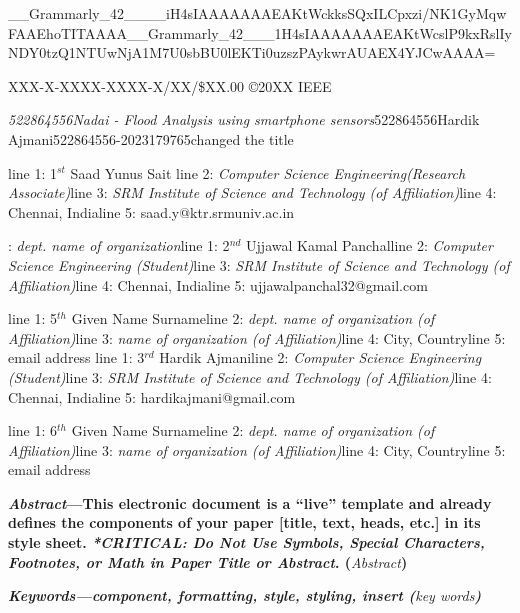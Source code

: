 \documentclass{article} %
\begin{document}


\noindent \_\_Grammarly\_42\_\_\_\_iH4sIAAAAAAAEAKtWckksSQxILCpxzi/NK1GyMqwFAAEhoTITAAAA\_\_Grammarly\_42\_\_\_1H4sIAAAAAAAEAKtWcslP9kxRslIyNDY0tzQ1NTUwNjA1M7U0sbBU0lEKTi0uzszPAykwrAUAEX4YJCwAAAA=

\noindent 

\noindent 

\noindent 

\noindent XXX-X-XXXX-XXXX-X/XX/\$XX.00 {\copyright}20XX IEEE

\noindent \textit{522864556Nadai - Flood Analysis using smartphone sensors}522864556Hardik Ajmani522864556-2023179765changed the title\textit{}

\noindent 

\noindent line 1: 1${}^{st}$ Saad Yunus Sait line 2: \textit{Computer Science Engineering(Research Associate)}line 3: \textit{SRM Institute of Science and Technology (of Affiliation)}line 4: Chennai, Indialine 5: saad.y@ktr.srmuniv.ac.in

: \textit{dept. name of organization}line 1: 2${}^{nd}$ Ujjawal Kamal Panchalline 2: \textit{Computer Science Engineering (Student)}line 3: \textit{SRM Institute of Science and Technology                                          (of Affiliation)}line 4: Chennai, Indialine 5: ujjawalpanchal32@gmail.com

\noindent line 1: 5${}^{th}$ Given Name Surnameline 2: \textit{dept. name of organization (of Affiliation)}line 3: \textit{name of organization (of Affiliation)}line 4: City, Countryline 5: email address line 1: 3${}^{rd}$ Hardik Ajmaniline 2: \textit{Computer Science Engineering (Student)}line 3: \textit{SRM Institute of Science and Technology (of Affiliation)}line 4: Chennai, Indialine 5: hardikajmani@gmail.com

\noindent line 1: 6${}^{th}$ Given Name Surnameline 2: \textit{dept. name of organization (of Affiliation)}line 3: \textit{name of organization (of Affiliation)}line 4: City, Countryline 5: email address 

\textbf{\textit{Abstract}---This electronic document is a ``live'' template and already defines the components of your paper [title, text, heads, etc.] in its style sheet.  \textit{*CRITICAL:  Do Not Use Symbols, Special Characters, Footnotes, or Math in Paper Title or Abstract}. (}\textit{Abstract}\textbf{)}

\textbf{\textit{Keywords---component, formatting, style, styling, insert (}}\textit{key words}\textbf{\textit{)}}
\end{document}

